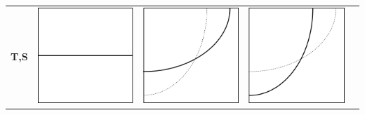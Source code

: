 \begin{table}[!h]
\begin{center}
\begin{tabular}{|r|c|c|c|c|}
  \textbf{T,S}
     & \includegraphics[scale=0.25]{isothermets.png}
     & \includegraphics[scale=0.25]{isochorets.png}
     & \includegraphics[scale=0.25]{isobarets.png}

\end{tabular}
\end{center}
\end{table}
